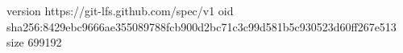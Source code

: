 version https://git-lfs.github.com/spec/v1
oid sha256:8429ebc9666ae355089788fcb900d2bc71c3c99d581b5c930523d60ff267e513
size 699192
